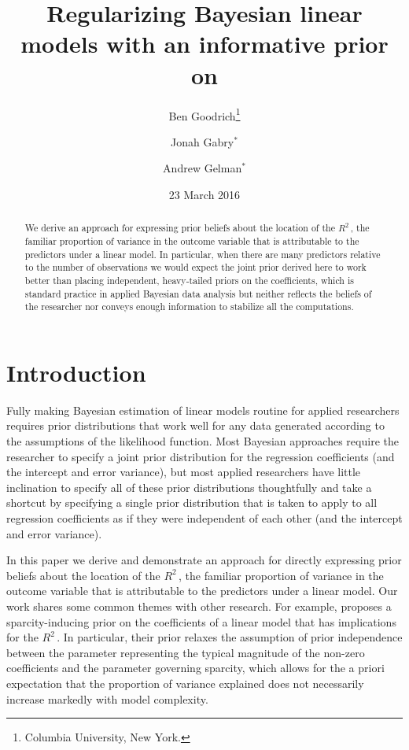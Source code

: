 \documentclass[11pt]{article}
\title{\bf Regularizing Bayesian linear models with an informative prior on \Rsq
    \vspace{.1in}}
\author{Ben Goodrich\footnote{Columbia University, New York.}
    \and Jonah Gabry$^\ast$
    \and Andrew Gelman$^\ast$
    \vspace{.1in}}
\date{23 March 2016
    \vspace{-.2in}}
\newcommand{\Rsq}{$R^2\,$}
\begin{document}
\maketitle
\thispagestyle{empty}

\begin{abstract}
\noindent We derive an approach for expressing prior beliefs about the location
of the \Rsq, the familiar proportion of variance in the outcome variable that is
attributable to the predictors under a linear model. In particular, when there
are many predictors relative to the number of observations we would expect the
joint prior derived here to work better than placing independent, heavy-tailed
priors on the coefficients, which is  standard practice in applied Bayesian data
analysis but neither reflects the beliefs of the researcher nor conveys enough
information to stabilize all the computations.
\end{abstract}


\section{Introduction}


Fully making Bayesian estimation of linear models routine for applied
researchers requires prior distributions that work well for any data generated
according to the assumptions of the likelihood function. Most Bayesian
approaches require the researcher to specify a joint prior distribution for the
regression coefficients (and the intercept and error variance), but most applied
researchers have little inclination to specify all of these prior distributions
thoughtfully and take a shortcut by specifying a single prior distribution that
is taken to apply to all regression coefficients as if they were independent of
each other (and the intercept and error variance).

In this paper we derive and demonstrate an approach for directly expressing
prior beliefs about the location of the \Rsq, the familiar proportion of
variance in the outcome variable that is attributable to the predictors under a
linear model. Our work shares some common themes with other research. For
example,  proposes a sparcity-inducing prior on the
coefficients of a linear model that has implications for the \Rsq. In
particular, their prior relaxes the assumption of prior independence between the
parameter representing the typical magnitude of the non-zero coefficients and
the parameter governing sparcity, which allows for the a priori expectation that
the proportion of variance explained does not necessarily increase markedly with
model complexity.
\end{document}

